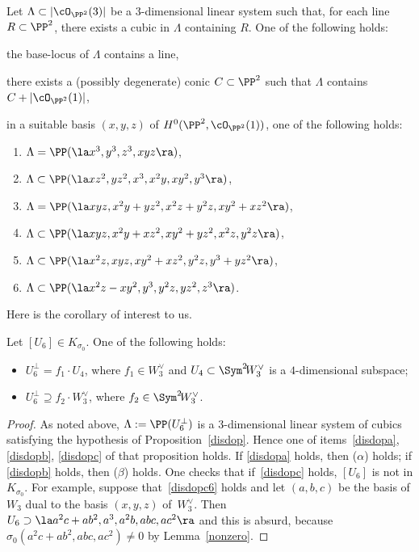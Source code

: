 \begin{prop}\label{disdop}
Let $\Lambda\subset|\cO_{\PP^2}(3)|$ be a $3$-dimensional linear system such that, for each line $R\subset \PP^2$, there exists a cubic in $\Lambda$ containing $R$. One of the following holds:
\begin{enumeratea}
\item\label{disdopa}
the base-locus of $\Lambda$ contains a line,
\item\label{disdopb}
there exists a (possibly degenerate) conic $C\subset \PP^2$ such that $\Lambda$ contains $C+|\cO_{\PP^2}(1)|$,
\item\label{disdopc}
in a suitable basis $(x,y,z)$ of $H^0(\PP^2,\cO_{\PP^2}(1))$, one of the following holds:
\begin{enumerate}
\item\label{disdopc1}
$\Lambda=\PP(\la x^3,y^3,z^3,xyz\ra)$,
\item\label{disdopc2}
$\Lambda\subset\PP(\la xz^2,yz^2,x^3,x^2y,xy^2,y^3\ra)$,
\item\label{disdopc3}
$\Lambda=\PP(\la xyz,x^2y+yz^2,x^2z+y^2z,xy^2+xz^2\ra)$,
\item\label{disdopc4}
$\Lambda\subset\PP(\la xyz,x^2y+xz^2,xy^2+yz^2,x^2z,y^2z\ra)$,
\item\label{disdopc5}
$\Lambda\subset\PP(\la x^2z, xyz, xy^2+xz^2,y^2z, y^3+yz^2 \ra)$,
\item\label{disdopc6}
$\Lambda\subset\PP(\la x^2z-xy^2, y^3, y^2z, yz^2, z^3 \ra)$.
\end{enumerate}
\end{enumeratea}
\end{prop}

Here is the corollary of interest to us.

\begin{coro}\label{tutti2jet}
Let $[U_6]\in K_{\sigma_0}$. One of the following holds:
\begin{itemize}
\item[$(\alpha)$]
$U_6^{\bot}=f_1\cdot U_4$, where $ f_1\in W_3^{\vee}$ and $U_4\subset\Sym^2\! W_3^{\vee}$ is a $4$-dimensional subspace;
\item[$(\beta)$]
$U_6^{\bot}\supseteq f_2\cdot W_3^{\vee}$, where $ f_2\in\Sym^2\! W_3^{\vee}$.
\end{itemize}
\end{coro}

\begin{proof}
As noted above, $\Lambda:=\PP(U^{\bot}_6)$ is a $3$-dimensional linear system of cubics satisfying the hypothesis of Proposition~\ref{disdop}. Hence one of items~\eqref{disdopa}, \eqref{disdopb}, \eqref{disdopc} of that proposition holds. If \eqref{disdopa} holds, then ($\alpha$) holds; if
\eqref{disdopb} holds, then ($\beta$) holds. One checks that if~\eqref{disdopc} holds, $[U_6]$ is not in $K_{\sigma_0}$. For example, suppose that~\eqref{disdopc6} holds and let $(a,b,c)$ be the basis of $W_3$ dual to the basis $(x,y,z)$ of~$W_3^{\vee}$. Then $U_6\supset\la a^2c+ab^2,a^3,a^2b,abc,ac^2\ra$ and this is absurd, because
$\sigma_0(a^2c+ab^2,abc,ac^2)\not=0$ by Lemma~\ref{nonzero}.
\end{proof}

